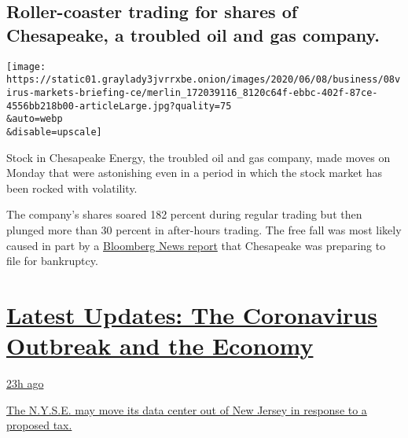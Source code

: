 \hypertarget{roller-coaster-trading-for-shares-of-chesapeake-a-troubled-oil-and-gas-company}{%
\subsection{Roller-coaster trading for shares of Chesapeake, a troubled
oil and gas
company.}\label{roller-coaster-trading-for-shares-of-chesapeake-a-troubled-oil-and-gas-company}}

\texttt{[image: https://static01.graylady3jvrrxbe.onion/images/2020/06/08/business/08virus-markets-briefing-ce/merlin\_172039116\_8120c64f-ebbc-402f-87ce-4556bb218b00-articleLarge.jpg?quality=75\\\&auto=webp\\\&disable=upscale]}

Stock in Chesapeake Energy, the troubled oil and gas company, made moves
on Monday that were astonishing even in a period in which the stock
market has been rocked with volatility.

The company's shares soared 182 percent during regular trading but then
plunged more than 30 percent in after-hours trading. The free fall was
most likely caused in part by a
\href{https://www.bloomberg.com/news/articles/2020-06-08/chesapeake-energy-plans-bankruptcy-that-may-give-lenders-control?sref=tnuvvlQG}{Bloomberg
News report} that Chesapeake was preparing to file for bankruptcy.

\hypertarget{latest-updates-the-coronavirus-outbreak-and-the-economy}{%
\section{\texorpdfstring{\href{https://www.nytimes3xbfgragh.onion/live/2020/09/11/business/stock-market-today-coronavirus?action=click\&pgtype=Article\&state=default\&region=MAIN_CONTENT_1\&context=storylines_live_updates}{Latest
Updates: The Coronavirus Outbreak and the
Economy}}{Latest Updates: The Coronavirus Outbreak and the Economy}}\label{latest-updates-the-coronavirus-outbreak-and-the-economy}}

\href{https://www.nytimes3xbfgragh.onion/live/2020/09/11/business/stock-market-today-coronavirus?action=click\&pgtype=Article\&state=default\&region=MAIN_CONTENT_1\&context=storylines_live_updates\#the-nyse-may-move-its-data-center-out-of-new-jersey-in-response-to-a-proposed-tax}{23h
ago}

\href{https://www.nytimes3xbfgragh.onion/live/2020/09/11/business/stock-market-today-coronavirus?action=click\&pgtype=Article\&state=default\&region=MAIN_CONTENT_1\&context=storylines_live_updates\#the-nyse-may-move-its-data-center-out-of-new-jersey-in-response-to-a-proposed-tax}{The
N.Y.S.E. may move its data center out of New Jersey in response to a
proposed tax.}

